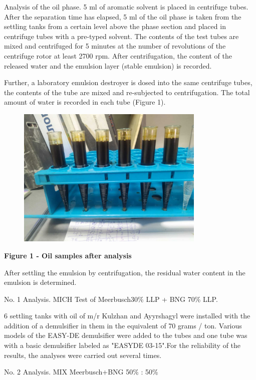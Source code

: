 Analysis of the oil phase. 5 ml of aromatic solvent is placed in
centrifuge tubes. After the separation time has elapsed, 5 ml of the oil
phase is taken from the settling tanks from a certain level above the
phase section and placed in centrifuge tubes with a pre-typed solvent.
The contents of the test tubes are mixed and centrifuged for 5 minutes
at the number of revolutions of the centrifuge rotor at least 2700 rpm.
After centrifugation, the content of the released water and the emulsion
layer (stable emulsion) is recorded.

Further, a laboratory emulsion destroyer is dosed into the same
centrifuge tubes, the contents of the tube are mixed and re-subjected to
centrifugation. The total amount of water is recorded in each tube
(Figure 1).

\begin{figure}[H]
	\centering
	\includegraphics[width=0.8\textwidth]{assets/1075}
	\caption*{}
\end{figure}

\textbf{Figure 1 - Oil samples after analysis}

After settling the emulsion by centrifugation, the residual water
content in the emulsion is determined.

No. 1 Analysis. MICH Test of Meerbusch30\% LLP + BNG 70\% LLP.

6 settling tanks with oil of m/r Kulzhan and Ayyrshagyl were installed
with the addition of a demulsifier in them in the equivalent of 70 grams
/ ton. Various models of the EASY-DE demulsifier were added to the tubes
and one tube was with a basic demulsifier labeled as "EASYDE 03-15".For
the reliability of the results, the analyses were carried out several
times.

No. 2 Analysis. MIX Meerbusch+BNG 50\% : 50\%

